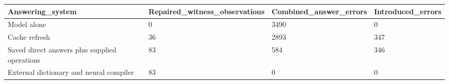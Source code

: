 \begin{tabular}{llll}
Answering\_system & Repaired\_witness\_observations & Combined\_answer\_errors & Introduced\_errors \\
\hline
Model alone & 0 & 3490 & 0 \\
Cache refresh & 36 & 2893 & 347 \\
Saved direct answers plus supplied operations & 83 & 584 & 346 \\
External dictionary and neural compiler & 83 & 0 & 0 \\
\end{tabular}
